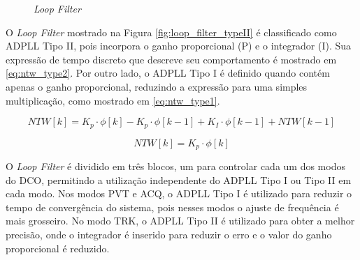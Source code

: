 \begin{figure}[h!]
	\caption{\textit{Loop Filter} }
	\begin{center}
	\hfil
	\end{center}
	\label{fig:loop_filter_structure}
\end{figure}

 O \textit{Loop Filter} mostrado na Figura \ref{fig:loop_filter_typeII} é classificado  como ADPLL Tipo II, pois incorpora  o ganho proporcional (P) e o integrador (I). Sua expressão de tempo discreto que descreve seu comportamento é mostrado em \ref{eq:ntw_type2}. Por outro lado, o ADPLL Tipo I é definido quando contém apenas o ganho proporcional,  reduzindo a expressão para uma simples multiplicação, como mostrado em \ref{eq:ntw_type1}.
 
 \begin{equation}
 	NTW[k]= K_p \cdot \phi [k] - K_p \cdot \phi [k -1] + K_I \cdot \phi [k-1] + NTW[k-1]
 	\label{eq:ntw_type2}
 \end{equation}
 
 \begin{equation}
 	NTW[k]= K_p \cdot \phi [k] 
 	\label{eq:ntw_type1}
 \end{equation}


O \textit{Loop Filter} é dividido em três blocos, um para controlar cada um dos modos do DCO,  permitindo a utilização independente do ADPLL Tipo I ou Tipo II em cada modo. Nos modos PVT e ACQ, o ADPLL Tipo I é utilizado para reduzir o tempo de convergência do sistema, pois nesses modos o ajuste de frequência é mais grosseiro. No modo TRK, o ADPLL Tipo II é utilizado para obter a melhor precisão, onde o integrador é inserido para reduzir o erro e o valor do ganho proporcional é reduzido.
 
